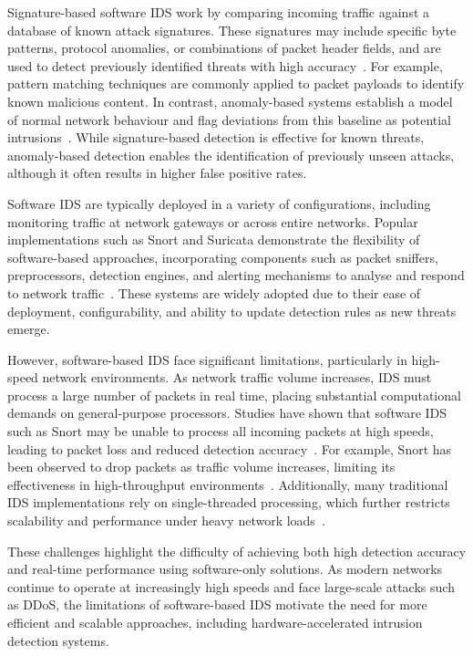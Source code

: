 Signature-based software IDS work by comparing incoming traffic against a database of known attack signatures. These signatures may include specific byte patterns, protocol anomalies, or combinations of packet header fields, and are used to detect previously identified threats with high accuracy~\cite{kumar_survey_nodate, abdulganiyu_systematic_2023}. For example, pattern matching techniques are commonly applied to packet payloads to identify known malicious content. In contrast, anomaly-based systems establish a model of normal network behaviour and flag deviations from this baseline as potential intrusions~\cite{kumar_survey_nodate, abdulganiyu_systematic_2023}. While signature-based detection is effective for known threats, anomaly-based detection enables the identification of previously unseen attacks, although it often results in higher false positive rates.

Software IDS are typically deployed in a variety of configurations, including monitoring traffic at network gateways or across entire networks. Popular implementations such as Snort and Suricata demonstrate the flexibility of software-based approaches, incorporating components such as packet sniffers, preprocessors, detection engines, and alerting mechanisms to analyse and respond to network traffic~\cite{park_performance_2017}. These systems are widely adopted due to their ease of deployment, configurability, and ability to update detection rules as new threats emerge.

However, software-based IDS face significant limitations, particularly in high-speed network environments. As network traffic volume increases, IDS must process a large number of packets in real time, placing substantial computational demands on general-purpose processors. Studies have shown that software IDS such as Snort may be unable to process all incoming packets at high speeds, leading to packet loss and reduced detection accuracy~\cite{noauthor_pdf_nodate}. For example, Snort has been observed to drop packets as traffic volume increases, limiting its effectiveness in high-throughput environments~\cite{noauthor_pdf_nodate}. Additionally, many traditional IDS implementations rely on single-threaded processing, which further restricts scalability and performance under heavy network loads~\cite{park_performance_2017}.

These challenges highlight the difficulty of achieving both high detection accuracy and real-time performance using software-only solutions. As modern networks continue to operate at increasingly high speeds and face large-scale attacks such as DDoS, the limitations of software-based IDS motivate the need for more efficient and scalable approaches, including hardware-accelerated intrusion detection systems.

